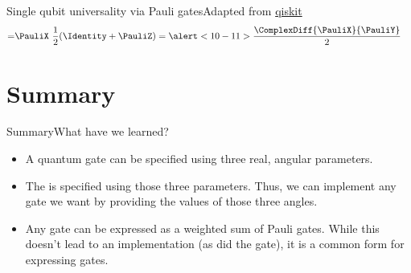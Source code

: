{\begin{frame}{Single qubit universality via Pauli gates}{Adapted from \href{https://qiskit.org/textbook/ch-gates/proving-universality.html\#pauli}{qiskit}}
{{\begin{align*}
    = & \PauliX\ \frac{1}{2}(\Identity+\PauliZ)
    = \alert<10-11>{\frac{\ComplexDiff{\PauliX}{\PauliY}}{2}}
\end{align*}%
}%
}

\end{frame}}

\section*{Summary}

\begin{frame}{Summary}{What have we learned?}

\begin{itemize}
    \item A quantum gate can be specified using three real, angular parameters.
    \item The  is specified using those three parameters.   Thus, we can implement any gate we want by providing the values of those three angles.
    \item Any gate can be expressed as a weighted sum of Pauli gates.  While this doesn't lead to an implementation (as did the  gate), it is a common form for expressing gates. 
\end{itemize}
    
\end{frame}

